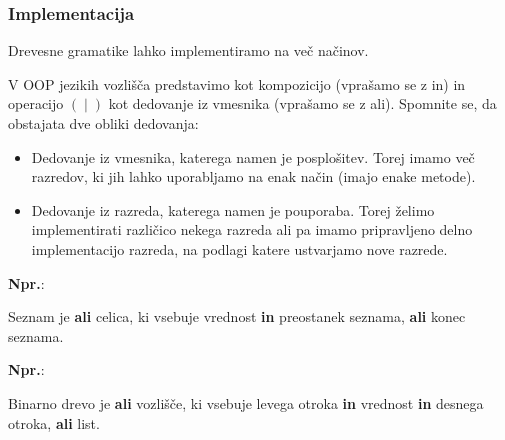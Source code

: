 \documentclass{report}
\newcommand{\Ex}{\textbf{Npr.}:\ }
\newcommand{\Union}{\mathrel{|}}
\begin{document}
\subsubsection*{Implementacija}
Drevesne gramatike lahko implementiramo na več načinov.

V OOP jezikih vozlišča predstavimo kot kompozicijo (vprašamo se z in) in operacijo $(\Union)$ kot dedovanje iz vmesnika (vprašamo se z ali).
Spomnite se, da obstajata dve obliki dedovanja:
\begin{itemize}
  \item Dedovanje iz vmesnika, katerega namen je posplošitev.
    Torej imamo več razredov, ki jih lahko uporabljamo na enak način (imajo enake metode).
  \item Dedovanje iz razreda, katerega namen je pouporaba.
    Torej želimo implementirati različico nekega razreda ali pa imamo pripravljeno delno implementacijo razreda, na podlagi katere ustvarjamo nove razrede.
\end{itemize}

\Ex

Seznam je \textbf{ali} celica, ki vsebuje vrednost \textbf{in} preostanek seznama, \textbf{ali} konec seznama.

\begin{center}
\end{center}

\Ex

Binarno drevo je \textbf{ali} vozlišče, ki vsebuje levega otroka \textbf{in} vrednost \textbf{in} desnega otroka, \textbf{ali} list.
\end{document}
